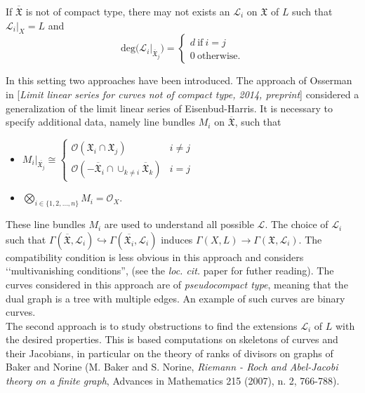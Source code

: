 If $\overline{\mathfrak{X}}$ is not of compact type, there may not exists an $\mathcal{L}_i$ on $\mathfrak{X}$ of $L$ such that $\mathcal{L}_i|_X =L$ and 
\[
\textrm{deg}\big( \mathcal{L}_i|_{\overline{\mathfrak{X}}_j} \big) = 
\begin{cases} d \ \textrm{if} \ i=j \\ 
0 \ \textrm{otherwise}. 
\end{cases}
\]

In this setting two approaches have been introduced. The approach of Osserman in [{\sl Limit linear series for curves not of compact type, 2014, preprint}] considered a generalization of the limit linear series of Eisenbud-Harris.  
It is necessary to specify additional data, namely line bundles $M_i$ on $\overline{\mathfrak{X}}$, such that 
\begin{itemize}
\item $ M_i|_{\overline{\mathfrak{X}_j}} \cong \begin{cases} \mathcal{O}(\mathfrak{X}_i \cap \mathfrak{X}_j) & i \not = j \\
\mathcal{O}(-\overline{\mathfrak{X}}_i \cap \cup_{k \not = i} \overline{\mathfrak{X}}_k) &i = j \end{cases} $
\item $\bigotimes_{i \in \{1, 2, \dots, n\}} M_i = \mathcal{O}_X$. 
\end{itemize}
These line bundles $M_i$ are used to understand all possible $\mathcal{L}$. The choice of $\mathcal{L}_i$ such that $\Gamma(\overline{\mathfrak{X}}, \mathcal{L}_i) \hookrightarrow  \Gamma(\overline{\mathfrak{X}_i}, \mathcal{L}_i)$ induces $ \Gamma(X, L) \rightarrow \Gamma(\mathfrak{X}, \mathcal{L}_i)$. The compatibility condition is less obvious in this approach and considers \lq \lq multivanishing conditions'', (see the {\sl loc. cit.} paper for futher reading). 
The curves considered in this approach are of {\sl pseudocompact type}, meaning that the dual graph is a tree with multiple edges. An example of such curves are binary curves. \\


The second approach is to study obstructions to find the extensions $\mathcal{L}_i$ of $L$ with the desired properties. This is based computations on skeletons of curves and their Jacobians, in particular on the theory of ranks of divisors on graphs of Baker and Norine (M. Baker and S. Norine, {\sl Riemann - Roch and Abel-Jacobi theory on a finite graph}, Advances in Mathematics 215 (2007), n. 2, 766-788).
